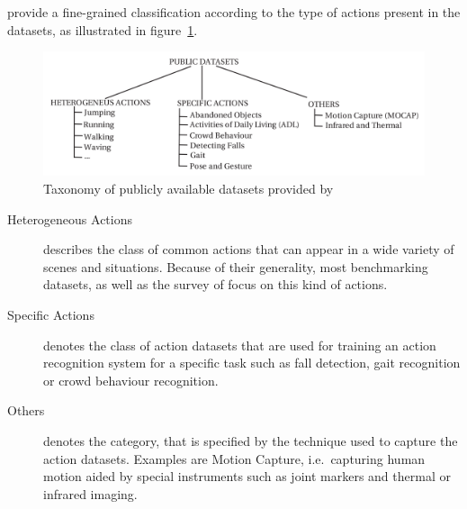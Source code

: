 \textcite{chaquet_survey_2013} provide a fine-grained classification according to the type of actions present in the datasets, as illustrated in figure~\ref{fig:datasetssurvey_taxonomy}.
\begin{figure}[H]
    \centering
    \includegraphics[width=\textwidth]{img_datasets/datasetssurvey_taxonomy}
    \caption{Taxonomy of publicly available datasets provided by \cite{chaquet_survey_2013}}
    \label{fig:datasetssurvey_taxonomy}
\end{figure}
\begin{description}
    \item[Heterogeneous Actions] describes the class of common actions that can appear in a wide variety of scenes and situations.
        Because of their generality, most benchmarking datasets, as well as the survey of \textcite{chaquet_survey_2013} focus on this kind of actions.
    \item[Specific Actions] denotes the class of action datasets that are used for training an action recognition system for a specific task such as fall detection, gait recognition or crowd behaviour recognition.
    \item[Others] denotes the category, that is specified by the technique used to capture the action datasets. Examples are Motion Capture, i.e.\ capturing human motion aided by special instruments such as joint markers and thermal or infrared imaging.
\end{description}

